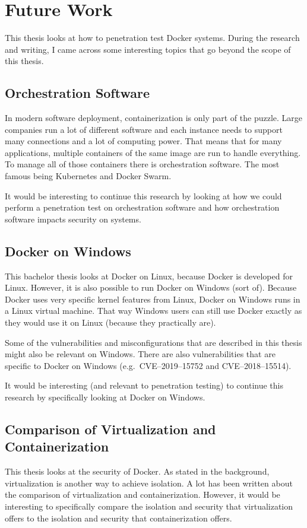\chapter{Future Work}
This thesis looks at how to penetration test Docker systems. During the research and writing, I came across some interesting topics that go beyond the scope of this thesis.

\section{Orchestration Software}
In modern software deployment, containerization is only part of the puzzle. Large companies run a lot of different software and each instance needs to support many connections and a lot of computing power. That means that for many applications, multiple containers of the same image are run to handle everything. To manage all of those containers there is orchestration software. The most famous being Kubernetes and Docker Swarm.

It would be interesting to continue this research by looking at how we could perform a penetration test on orchestration software and how orchestration software impacts security on systems.

\section{Docker on Windows}
This bachelor thesis looks at Docker on Linux, because Docker is developed for Linux. However, it is also possible to run Docker on Windows (sort of). Because Docker uses very specific kernel features from Linux, Docker on Windows runs in a Linux virtual machine. That way Windows users can still use Docker exactly as they would use it on Linux (because they practically are).

\medskip

Some of the vulnerabilities and misconfigurations that are described in this thesis might also be relevant on Windows. There are also vulnerabilities that are specific to Docker on Windows (e.g.\ CVE--2019--15752 and CVE--2018--15514).

\medskip

It would be interesting (and relevant to penetration testing) to continue this research by specifically looking at Docker on Windows.

\section{Comparison of Virtualization and Containerization}
This thesis looks at the security of Docker. As stated in the background, virtualization is another way to achieve isolation. A lot has been written about the comparison of virtualization and containerization\cite{Virtualization-vs-Containerization-to-Support-PaaS}\cite{Hypervisor-vs-Lightweight-Virtualization}\cite{Updated-Performance-Comparison-Virtual-Machines-Containers}.
However, it would be interesting to specifically compare the isolation and security that virtualization offers to the isolation and security that containerization offers.

